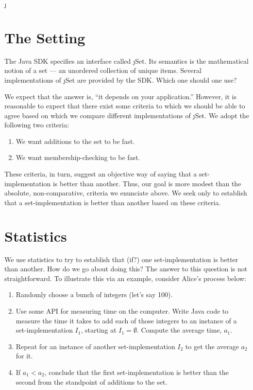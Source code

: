 
\DeclareUrlCommand\j{}




\section{The Setting}\label{sec:setting}
The Java SDK \cite{xxx} specifies an interface called \j{Set}. Its semantics
is the mathematical notion of a set --- an unordered collection of unique items.
Several implementations of \j{Set} are provided by the SDK.
Which one should one use?

We expect that the answer is, ``it depends on your application.'' However, it
is reasonable to expect that there exist some criteria to which we should
be able to agree based on which we compare different implementations of \j{Set}.
We adopt the following two criteria:
\begin{enumerate}
    \item We want additions to the set to be fast.
    \item We want membership-checking to be fast.
\end{enumerate}

These criteria, in turn, suggest an objective way of saying that
a set-implementation is better than another. Thus, our goal is
more modest than the absolute, non-comparative, criteria we
enunciate above. We seek only to establish that a set-implementation
is better than another based on these criteria.

\section{Statistics} \label{sec:statistics}

We use statistics to try to establish that (if?) one set-implementation
is better than another. How do we go about doing this? The answer
to this question is not straightforward. To illustrate this via
an example, consider Alice's process below:

\begin{enumerate}
\item Randomly choose a bunch of integers (let's say 100).

\item Use some API for measuring time on the computer.
Write Java code to measure the time it takes to add each of
those integers to an instance of a set-implementation $I_1$,
starting at $I_1 = \emptyset$. Compute the average time, $a_1$.

\item Repeat for an instance of another set-implementation
$I_2$ to get the average $a_2$ for it.

\item If $a_1 < a_2$, conclude that the first set-implementation
is better than the second from the standpoint of additions to the set.
\end{enumerate}

